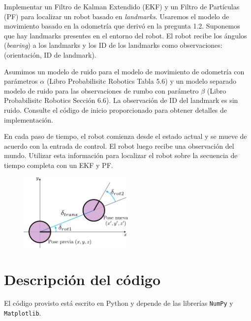 \documentclass[tp]{lcc}
\begin{document}
	Implementar un Filtro de Kalman Extendido (EKF) y un Filtro de Partículas (PF) para localizar un robot basado en \emph{landmarks}. Usaremos el modelo de movimiento basado en la odometría que derivó en la pregunta 1.2. Suponemos que hay landmarks presentes en el entorno del robot. El robot recibe los ángulos (\emph{bearing}) a los landmarks y los ID de los landmarks como observaciones: (orientación, ID de landmark).
	
	Asumimos un modelo de ruido para el modelo de movimiento de odometría con parámetros $\alpha$ (Libro Probabilisitc Robotics Tabla 5.6) y un modelo separado modelo de ruido para las observaciones de rumbo con parámetro $\beta$ (Libro Probabilisitc Robotics Sección 6.6). La observación de ID del landmark es sin ruido. Consulte el código de inicio proporcionado para obtener detalles de implementación.
	
	En cada paso de tiempo, el robot comienza desde el estado actual y se mueve de acuerdo con la entrada de control. El robot luego recibe una observación del mundo. Utilizar esta información para localizar el robot sobre la secuencia de tiempo completa con un EKF y PF.
	
	\begin{figure}[!htbp]
		\centering
		\includegraphics[width=0.5\textwidth]{./images/odometry_as_controls.pdf}
		\label{fig:odometry-base-motion-model}
	\end{figure}

	\section{Descripción del código}
	
	El código provisto está escrito en Python y depende de las librerías \lstinline[style=bash]{NumPy} y \lstinline[style=bash]{Matplotlib}.
	
\end{document}

